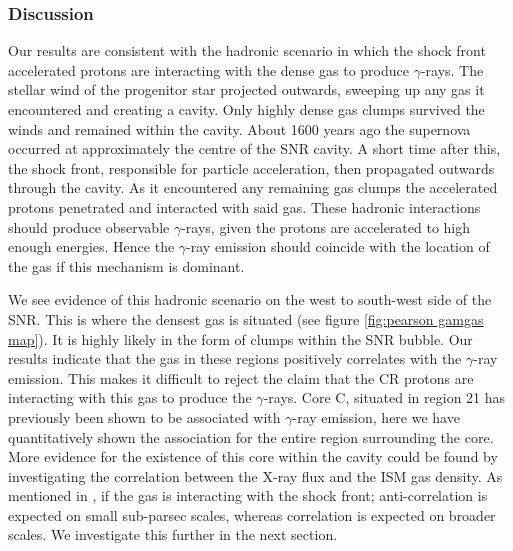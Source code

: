 \documentclass[12pt,a4paper]{article}
\begin{document}
\subsubsection{Discussion}
Our results are consistent with the hadronic scenario in which the shock front accelerated protons are interacting with the dense gas to produce $\gamma$-rays.
The stellar wind of the progenitor star projected outwards, sweeping up any gas it encountered and creating a cavity. 
Only highly dense gas clumps survived the winds and remained within the cavity.
About 1600 years ago the supernova occurred at approximately the centre of the SNR cavity. 
A short time after this, the shock front, responsible for particle acceleration, then propagated outwards through the cavity.
As it encountered any remaining gas clumps the accelerated protons penetrated and interacted with said gas. 
These hadronic interactions should produce observable $\gamma$-rays, given the protons are accelerated to high enough energies.
Hence the $\gamma$-ray emission should coincide with the location of the gas if this mechanism is dominant.

We see evidence of this hadronic scenario on the west to south-west side of the SNR. 
This is where the densest gas is situated (see figure \ref{fig:pearson gamgas map}).
It is highly likely in the form of clumps within the SNR bubble.
Our results indicate that the gas in these regions positively correlates with the $\gamma$-ray emission.
This makes it difficult to reject the claim that the CR protons are interacting with this gas to produce the $\gamma$-rays.
Core C, situated in region 21 has previously been shown to be associated with $\gamma$-ray emission, here we have quantitatively shown the association for the entire region surrounding the core.
More evidence for the existence of this core within the cavity could be found by investigating the correlation between the X-ray flux and the ISM gas density.
As mentioned in \cite{2012ApJ...744...71I}, if the gas is interacting with the shock front; anti-correlation is expected on small sub-parsec scales, whereas correlation is expected on broader scales.
We investigate this further in the next section.
\end{document}
